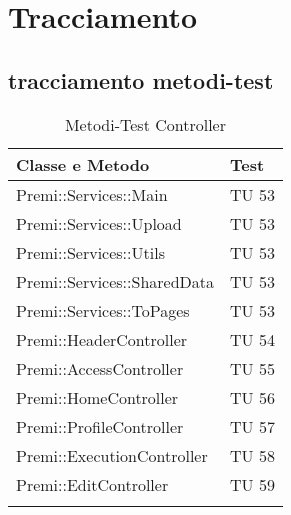 \section{Tracciamento}
\subsection{tracciamento metodi-test}
\begin{center}
\bgroup
\def\arraystretch{1.5}
\begin{longtable}{ | p{12cm} | p{2cm} | }
\hline
\cellcolor[gray]{0.9} \textbf{Classe e Metodo} & \cellcolor[gray]{0.9} \textbf{Test}
 \\ \hline
Premi::Services::Main & TU 53 \\ \hline 
Premi::Services::Upload & TU 53 \\ \hline
Premi::Services::Utils  & TU 53 \\ \hline
Premi::Services::SharedData & TU 53 \\ \hline
Premi::Services::ToPages & TU 53 \\ \hline
Premi::HeaderController & TU 54 \\ \hline
Premi::AccessController & TU 55 \\ \hline
Premi::HomeController & TU 56\\ \hline
Premi::ProfileController & TU 57 \\ \hline
Premi::ExecutionController & TU 58 \\ \hline
Premi::EditController & TU 59 \\ \hline

\caption{Metodi-Test Controller}
\end{longtable}
\egroup
\end{center}